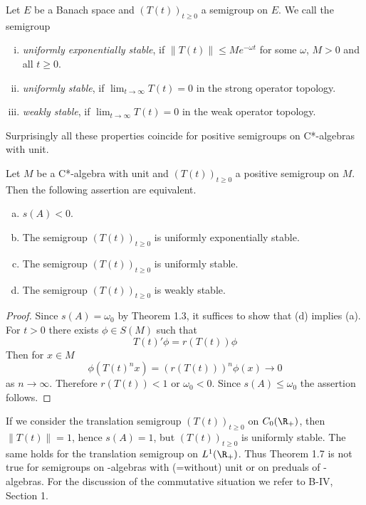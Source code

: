 \begin{definition}\label{def:d4-1.6}
Let $E$ be a Banach space and $(T(t))_{t \geq 0}$ a semigroup on $E$.
We call the semigroup
\begin{enumerate}[(i)]
\item 
\emph{uniformly exponentially stable}, if $\|T(t)\| \leq Me^{-\omega t}$ for some $\omega$, $M > 0$ and all $t \geq 0$.

\item 
\emph{uniformly stable}, if $\lim_{t \to \infty} T(t) = 0$ in the strong operator topology.

\item 
\emph{weakly stable}, if $\lim_{t \to \infty} T(t) = 0$ in the weak operator topology.
\end{enumerate}
\end{definition}
Surprisingly all these properties coincide for positive semigroups on C*-algebras with unit.
\begin{theorem}\label{thm:d4-1.7}
Let $M$ be a C*-algebra with unit and $(T(t))_{t \geq 0}$ a positive semigroup on $M$.
Then the following assertion are equivalent.

\begin{enumerate}[(a)]
\item 
$s(A) < 0$.

\item 
The semigroup $(T(t))_{t \geq 0}$ is uniformly exponentially stable.

\item 
The semigroup $(T(t))_{t \geq 0}$ is uniformly stable.

\item 
The semigroup $(T(t))_{t \geq 0}$ is weakly stable.

\end{enumerate}
\end{theorem}
\begin{proof}
Since $s(A) = \omega_{0}$ by Theorem 1.3, it suffices to show that (d) implies (a).
For $t > 0$ there exists $\phi \in S(M)$ such that
\[
    T(t)'\phi = r(T(t))\phi
\]
Then for $x \in M$
\[
    \phi(T(t)^{n}x) = (r(T(t)))^{n} \phi(x) \to 0
\]
as $n \to \infty$.
Therefore $r(T(t)) < 1$ or $\omega_{0} < 0$.
Since $s(A) \leq \omega_{0}$ the assertion follows.
\end{proof}
\begin{remark}\label{rem:d4-1.8}
If we consider the translation semigroup $(T(t))_{t \geq 0}$ on $C_{0}(\R_{+})$, then $\|T(t)\| = 1$, hence $s(A) = 1$, but $(T(t))_{t \geq 0}$ is uniformly stable.
The same holds for the translation semigroup on $L^1(\R_{+})$.
Thus Theorem 1.7 is not true for semigroups on \CA-algebras with (=without) unit or on preduals of \WA-algebras.
For the discussion of the commutative situation we refer to B-IV, Section 1.
\end{remark}
